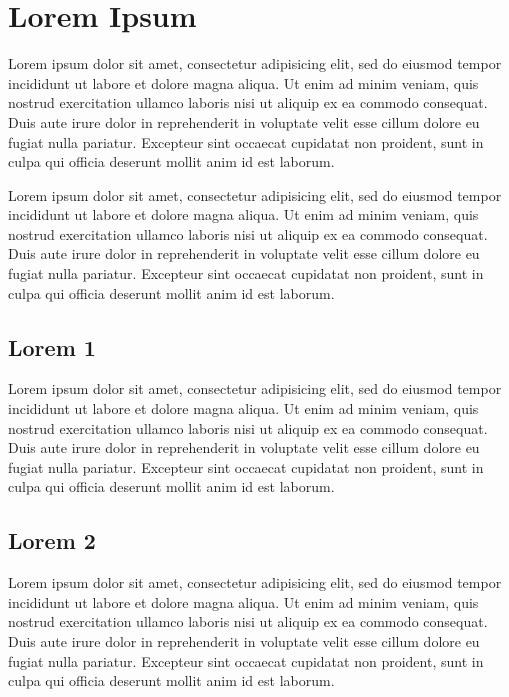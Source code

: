 \documentclass[a4paper, twocolumn, 11pt, twoside]{article}
\begin{document}
\section{Lorem Ipsum}

Lorem ipsum dolor sit amet, consectetur adipisicing elit, sed do eiusmod
tempor incididunt ut labore et dolore magna aliqua. Ut enim ad minim
veniam, quis nostrud exercitation ullamco laboris nisi ut aliquip ex ea
commodo consequat. Duis aute irure dolor in reprehenderit in voluptate
velit esse cillum dolore eu fugiat nulla pariatur. Excepteur sint
occaecat cupidatat non proident, sunt in culpa qui officia deserunt
mollit anim id est laborum.

Lorem ipsum dolor sit amet, consectetur adipisicing elit, sed do eiusmod
tempor incididunt ut labore et dolore magna aliqua. Ut enim ad minim
veniam, quis nostrud exercitation ullamco laboris nisi ut aliquip ex ea
commodo consequat. Duis aute irure dolor in reprehenderit in voluptate
velit esse cillum dolore eu fugiat nulla pariatur. Excepteur sint
occaecat cupidatat non proident, sunt in culpa qui officia deserunt
mollit anim id est laborum.

\subsection{Lorem 1}

Lorem ipsum dolor sit amet, consectetur adipisicing elit, sed do eiusmod
tempor incididunt ut labore et dolore magna aliqua. Ut enim ad minim
veniam, quis nostrud exercitation ullamco laboris nisi ut aliquip ex ea
commodo consequat. Duis aute irure dolor in reprehenderit in voluptate
velit esse cillum dolore eu fugiat nulla pariatur. Excepteur sint
occaecat cupidatat non proident, sunt in culpa qui officia deserunt
mollit anim id est laborum.

\subsection{Lorem 2}

Lorem ipsum dolor sit amet, consectetur adipisicing elit, sed do eiusmod
tempor incididunt ut labore et dolore magna aliqua. Ut enim ad minim
veniam, quis nostrud exercitation ullamco laboris nisi ut aliquip ex ea
commodo consequat. Duis aute irure dolor in reprehenderit in voluptate
velit esse cillum dolore eu fugiat nulla pariatur. Excepteur sint
occaecat cupidatat non proident, sunt in culpa qui officia deserunt
mollit anim id est laborum.
\end{document}
